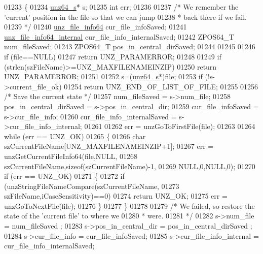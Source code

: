 \begin{DoxyCode}
01233 \{
01234     \hyperlink{structunz64__s}{unz64\_s}* s;
01235     \textcolor{keywordtype}{int} err;
01236 
01237     \textcolor{comment}{/* We remember the 'current' position in the file so that we can jump}
01238 \textcolor{comment}{     * back there if we fail.}
01239 \textcolor{comment}{     */}
01240     \hyperlink{structunz__file__info64__s}{unz\_file\_info64} cur\_file\_infoSaved;
01241     \hyperlink{structunz__file__info64__internal__s}{unz\_file\_info64\_internal} cur\_file\_info\_internalSaved;
01242     ZPOS64\_T num\_fileSaved;
01243     ZPOS64\_T pos\_in\_central\_dirSaved;
01244 
01245 
01246     \textcolor{keywordflow}{if} (file==NULL)
01247         \textcolor{keywordflow}{return} UNZ\_PARAMERROR;
01248 
01249     \textcolor{keywordflow}{if} (strlen(szFileName)>=UNZ\_MAXFILENAMEINZIP)
01250         \textcolor{keywordflow}{return} UNZ\_PARAMERROR;
01251 
01252     s=(\hyperlink{structunz64__s}{unz64\_s}*)file;
01253     \textcolor{keywordflow}{if} (!s->current\_file\_ok)
01254         \textcolor{keywordflow}{return} UNZ\_END\_OF\_LIST\_OF\_FILE;
01255 
01256     \textcolor{comment}{/* Save the current state */}
01257     num\_fileSaved = s->num\_file;
01258     pos\_in\_central\_dirSaved = s->pos\_in\_central\_dir;
01259     cur\_file\_infoSaved = s->cur\_file\_info;
01260     cur\_file\_info\_internalSaved = s->cur\_file\_info\_internal;
01261 
01262     err = unzGoToFirstFile(file);
01263 
01264     \textcolor{keywordflow}{while} (err == UNZ\_OK)
01265     \{
01266         \textcolor{keywordtype}{char} szCurrentFileName[UNZ\_MAXFILENAMEINZIP+1];
01267         err = unzGetCurrentFileInfo64(file,NULL,
01268                                     szCurrentFileName,\textcolor{keyword}{sizeof}(szCurrentFileName)-1,
01269                                     NULL,0,NULL,0);
01270         \textcolor{keywordflow}{if} (err == UNZ\_OK)
01271         \{
01272             \textcolor{keywordflow}{if} (unzStringFileNameCompare(szCurrentFileName,
01273                                             szFileName,iCaseSensitivity)==0)
01274                 \textcolor{keywordflow}{return} UNZ\_OK;
01275             err = unzGoToNextFile(file);
01276         \}
01277     \}
01278 
01279     \textcolor{comment}{/* We failed, so restore the state of the 'current file' to where we}
01280 \textcolor{comment}{     * were.}
01281 \textcolor{comment}{     */}
01282     s->num\_file = num\_fileSaved ;
01283     s->pos\_in\_central\_dir = pos\_in\_central\_dirSaved ;
01284     s->cur\_file\_info = cur\_file\_infoSaved;
01285     s->cur\_file\_info\_internal = cur\_file\_info\_internalSaved;

\end{DoxyCode}
